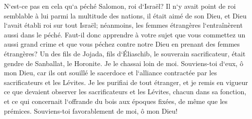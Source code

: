 \verse N`est-ce pas en cela qu`a péché Salomon, roi d`Israël? Il n`y avait point de roi semblable à lui parmi la multitude des nations, il était aimé de son Dieu, et Dieu l`avait établi roi sur tout Israël; néanmoins, les femmes étrangères l`entraînèrent aussi dans le péché. 
\verse Faut-il donc apprendre à votre sujet que vous commettez un aussi grand crime et que vous péchez contre notre Dieu en prenant des femmes étrangères? 
\verse Un des fils de Jojada, fils d`Éliaschib, le souverain sacrificateur, était gendre de Sanballat, le Horonite. Je le chassai loin de moi. 
\verse Souviens-toi d`eux, ô mon Dieu, car ils ont souillé le sacerdoce et l`alliance contractée par les sacrificateurs et les Lévites. 
\verse Je les purifiai de tout étranger, et je remis en vigueur ce que devaient observer les sacrificateurs et les Lévites, chacun dans sa fonction, 
\verse et ce qui concernait l`offrande du bois aux époques fixées, de même que les prémices. Souviens-toi favorablement de moi, ô mon Dieu! 
